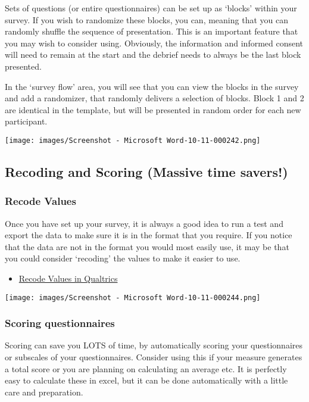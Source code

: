 \documentclass[
  letterpaper,
  DIV=11,
  numbers=noendperiod]{scrartcl}
\providecommand{\tightlist}{%
  \setlength{\itemsep}{0pt}\setlength{\parskip}{0pt}}\usepackage{longtable,booktabs,array}
\begin{document}
Sets of questions (or entire questionnaires) can be set up as `blocks'
within your survey. If you wish to randomize these blocks, you can,
meaning that you can randomly shuffle the sequence of presentation. This
is an important feature that you may wish to consider using. Obviously,
the information and informed consent will need to remain at the start
and the debrief needs to always be the last block presented.

In the `survey flow' area, you will see that you can view the blocks in
the survey and add a randomizer, that randomly delivers a selection of
blocks. Block 1 and 2 are identical in the template, but will be
presented in random order for each new participant.

\texttt{[image: images/Screenshot - Microsoft Word-10-11-000242.png]}

\subsection{Recoding and Scoring (Massive time
savers!)}\label{recoding-and-scoring-massive-time-savers}

\subsubsection{Recode Values}\label{recode-values}

Once you have set up your survey, it is always a good idea to run a test
and export the data to make sure it is in the format that you require.
If you notice that the data are not in the format you would most easily
use, it may be that you could consider `recoding' the values to make it
easier to use.

\begin{itemize}
\tightlist
\item
  \href{https://www.qualtrics.com/support/survey-platform/survey-module/question-options/recode-values/}{Recode
  Values in Qualtrics}
\end{itemize}

\texttt{[image: images/Screenshot - Microsoft Word-10-11-000244.png]}

\subsubsection{Scoring questionnaires}\label{scoring-questionnaires}

Scoring can save you LOTS of time, by automatically scoring your
questionnaires or subscales of your questionnaires. Consider using this
if your measure generates a total score or you are planning on
calculating an average etc. It is perfectly easy to calculate these in
excel, but it can be done automatically with a little care and
preparation.
\end{document}

